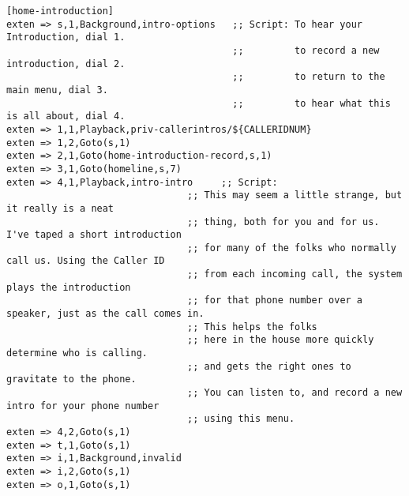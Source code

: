 \begin{verbatim}
[home-introduction]
exten => s,1,Background,intro-options   ;; Script: To hear your Introduction, dial 1.
                                        ;;         to record a new introduction, dial 2.
                                        ;;         to return to the main menu, dial 3.
                                        ;;         to hear what this is all about, dial 4.
exten => 1,1,Playback,priv-callerintros/${CALLERIDNUM}
exten => 1,2,Goto(s,1)
exten => 2,1,Goto(home-introduction-record,s,1)
exten => 3,1,Goto(homeline,s,7)
exten => 4,1,Playback,intro-intro     ;; Script:
                                ;; This may seem a little strange, but it really is a neat
                                ;; thing, both for you and for us. I've taped a short introduction
                                ;; for many of the folks who normally call us. Using the Caller ID
                                ;; from each incoming call, the system plays the introduction
                                ;; for that phone number over a speaker, just as the call comes in.
                                ;; This helps the folks
                                ;; here in the house more quickly determine who is calling.
                                ;; and gets the right ones to gravitate to the phone.
                                ;; You can listen to, and record a new intro for your phone number
                                ;; using this menu.
exten => 4,2,Goto(s,1)
exten => t,1,Goto(s,1)
exten => i,1,Background,invalid
exten => i,2,Goto(s,1)
exten => o,1,Goto(s,1)


\end{verbatim}
